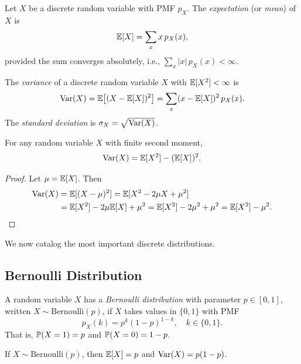 \documentclass[11pt,a4paper]{article}
\begin{document}
\begin{definition}
\label{def:discrete_expectation}
Let $X$ be a discrete random variable with PMF $p_X$. The
\emph{expectation} (or \emph{mean}) of $X$ is
\[
    \mathbb{E}[X] = \sum_{x} x \, p_X(x),
\]
provided the sum converges absolutely, i.e.,
$\sum_x |x| \, p_X(x) < \infty$.
\end{definition}

\begin{definition}
\label{def:discrete_variance}
The \emph{variance} of a discrete random variable $X$ with
$\mathbb{E}[X^2] < \infty$ is
\[
    \operatorname{Var}(X) = \mathbb{E}\bigl[(X - \mathbb{E}[X])^2\bigr]
    = \sum_x (x - \mathbb{E}[X])^2 \, p_X(x).
\]
The \emph{standard deviation} is $\sigma_X = \sqrt{\operatorname{Var}(X)}$.
\end{definition}

\begin{proposition}
\label{prop:var_formula}
For any random variable $X$ with finite second moment,
\[
    \operatorname{Var}(X) = \mathbb{E}[X^2] - (\mathbb{E}[X])^2.
\]
\end{proposition}

\begin{proof}
Let $\mu = \mathbb{E}[X]$. Then
\begin{align*}
    \operatorname{Var}(X) &= \mathbb{E}[(X - \mu)^2]
    = \mathbb{E}[X^2 - 2\mu X + \mu^2] \\
    &= \mathbb{E}[X^2] - 2\mu \mathbb{E}[X] + \mu^2
    = \mathbb{E}[X^2] - 2\mu^2 + \mu^2
    = \mathbb{E}[X^2] - \mu^2. \qedhere
\end{align*}
\end{proof}

We now catalog the most important discrete distributions.

\subsection{Bernoulli Distribution}

\begin{definition}
\label{def:bernoulli}
A random variable $X$ has a \emph{Bernoulli distribution} with parameter
$p \in [0,1]$, written $X \sim \mathrm{Bernoulli}(p)$, if $X$ takes
values in $\{0, 1\}$ with PMF
\[
    p_X(k) = p^k (1-p)^{1-k}, \quad k \in \{0,1\}.
\]
That is, $\mathbb{P}(X = 1) = p$ and $\mathbb{P}(X = 0) = 1 - p$.
\end{definition}

\begin{proposition}
\label{prop:bernoulli_moments}
If $X \sim \mathrm{Bernoulli}(p)$, then $\mathbb{E}[X] = p$ and
$\operatorname{Var}(X) = p(1-p)$.
\end{proposition}
\end{document}
